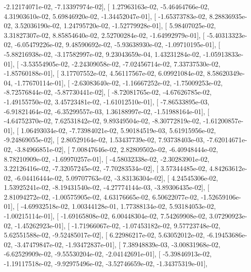 \documentclass{article}
\begin{document}
         -2.12174071e-02,  -7.13397974e-02],
       [  1.27963163e-02,  -5.46464766e-02,   4.31903610e-02,
          5.69846920e-02,  -1.34452047e-01],
       [ -1.65373783e-02,   8.28836935e-02,   3.52036190e-02,
          1.24795720e-02,  -1.52779928e-01],
       [  5.98407025e-02,   3.31827307e-02,   8.85854640e-02,
          2.52700284e-02,  -1.64992979e-01],
       [ -5.40313323e-02,  -6.05479226e-02,   9.48590692e-02,
         -5.93638930e-02,  -1.09710195e-01],
       [ -5.88216938e-02,  -3.17582997e-02,   9.23043659e-04,
          1.43231284e-02,  -1.05913833e-01],
       [ -3.53554905e-02,  -2.24309058e-02,  -7.02456714e-02,
          7.33737530e-02,  -1.85760188e-01],
       [  3.17707552e-02,   4.56117567e-02,   6.09921084e-02,
          8.58620349e-04,  -1.77670114e-01],
       [ -2.63083640e-02,  -1.16667252e-02,  -1.75009253e-02,
         -8.72576844e-02,  -5.87730441e-02],
       [ -8.72081765e-02,  -4.67626785e-02,  -1.49155750e-02,
          3.45723481e-02,  -1.61012510e-01],
       [ -7.86533895e-03,  -6.91821464e-02,  -6.35299557e-03,
          1.36188997e-02,  -1.51988164e-01],
       [ -4.64752370e-02,   7.62531842e-02,   9.89349504e-02,
         -8.30772819e-02,  -1.61200857e-01],
       [  1.06493034e-02,  -7.73984021e-02,   5.90184519e-03,
          5.61915956e-02,  -9.24869055e-02],
       [  2.80529164e-02,   1.53437739e-02,   7.93738403e-03,
         -7.62014671e-02,  -3.84966851e-02],
       [  7.00847646e-02,   2.82809502e-02,  -6.40948444e-02,
          8.78210909e-02,  -1.69970257e-01],
       [ -4.58032338e-02,  -2.30283901e-02,   3.22126416e-02,
         -7.32057245e-02,  -7.70283534e-02],
       [  3.57344485e-02,   4.84263612e-02,  -6.04416444e-02,
          5.09707763e-02,  -3.83136304e-02],
       [  4.24545306e-02,   1.53925241e-02,  -8.19431540e-02,
         -4.27774144e-03,  -3.89306435e-02],
       [  2.81094272e-02,  -1.00575905e-02,   4.63176665e-02,
          6.50622077e-02,  -1.52659106e-01],
       [ -4.69932518e-02,   1.00344128e-01,   1.77388134e-02,
          5.93184053e-02,  -1.00215114e-01],
       [ -1.69165808e-02,   6.00448304e-02,   7.54269908e-02,
          3.07290923e-02,  -1.45262923e-01],
       [ -1.71966067e-02,  -1.07453182e-02,   9.57723748e-02,
          5.62551588e-02,  -9.52485017e-02],
       [  6.22986217e-02,   5.63052012e-02,  -6.19453686e-02,
         -3.47479847e-02,  -1.93472837e-01],
       [  7.38948839e-03,  -3.00831968e-02,  -6.62529909e-02,
         -9.55530204e-02,  -2.04142691e-01],
       [ -5.39846913e-02,  -1.19117518e-02,  -9.92975496e-02,
         -3.52746659e-02,  -1.34375319e-01],
\end{document}
